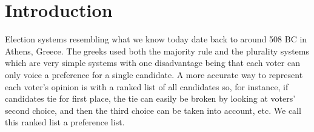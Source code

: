 
\chapter{Introduction}





	Election systems resembling what we know today date back to around 508 BC in Athens, Greece. The greeks used both the majority rule and the plurality systems which are very simple systems with one disadvantage being that each voter can only voice a preference for a single candidate. A more accurate way to represent each voter's opinion is with a ranked list of all candidates so, for instance, if candidates tie for first place, the tie can easily be broken by looking at voters' second choice, and then the third choice can be taken into account, etc. We call this ranked list a preference list.

